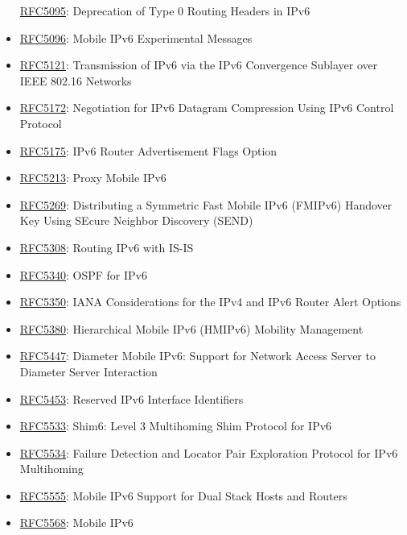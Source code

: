 \documentclass[
]{article}
\begin{document}
\begin{itemize}
  \href{https://www.rfc-editor.org/info/rfc5095}{RFC5095}: Deprecation
  of Type 0 Routing Headers in IPv6
\item
  \href{https://www.rfc-editor.org/info/rfc5096}{RFC5096}: Mobile IPv6
  Experimental Messages
\item
  \href{https://www.rfc-editor.org/info/rfc5121}{RFC5121}: Transmission
  of IPv6 via the IPv6 Convergence Sublayer over IEEE 802.16 Networks
\item
  \href{https://www.rfc-editor.org/info/rfc5172}{RFC5172}: Negotiation
  for IPv6 Datagram Compression Using IPv6 Control Protocol
\item
  \href{https://www.rfc-editor.org/info/rfc5175}{RFC5175}: IPv6 Router
  Advertisement Flags Option
\item
  \href{https://www.rfc-editor.org/info/rfc5213}{RFC5213}: Proxy Mobile
  IPv6
\item
  \href{https://www.rfc-editor.org/info/rfc5269}{RFC5269}: Distributing
  a Symmetric Fast Mobile IPv6 (FMIPv6) Handover Key Using SEcure
  Neighbor Discovery (SEND)
\item
  \href{https://www.rfc-editor.org/info/rfc5308}{RFC5308}: Routing IPv6
  with IS-IS
\item
  \href{https://www.rfc-editor.org/info/rfc5340}{RFC5340}: OSPF for IPv6
\item
  \href{https://www.rfc-editor.org/info/rfc5350}{RFC5350}: IANA
  Considerations for the IPv4 and IPv6 Router Alert Options
\item
  \href{https://www.rfc-editor.org/info/rfc5380}{RFC5380}: Hierarchical
  Mobile IPv6 (HMIPv6) Mobility Management
\item
  \href{https://www.rfc-editor.org/info/rfc5447}{RFC5447}: Diameter
  Mobile IPv6: Support for Network Access Server to Diameter Server
  Interaction
\item
  \href{https://www.rfc-editor.org/info/rfc5453}{RFC5453}: Reserved IPv6
  Interface Identifiers
\item
  \href{https://www.rfc-editor.org/info/rfc5533}{RFC5533}: Shim6: Level
  3 Multihoming Shim Protocol for IPv6
\item
  \href{https://www.rfc-editor.org/info/rfc5534}{RFC5534}: Failure
  Detection and Locator Pair Exploration Protocol for IPv6 Multihoming
\item
  \href{https://www.rfc-editor.org/info/rfc5555}{RFC5555}: Mobile IPv6
  Support for Dual Stack Hosts and Routers
\item
  \href{https://www.rfc-editor.org/info/rfc5568}{RFC5568}: Mobile IPv6

\end{itemize}
\end{document}
